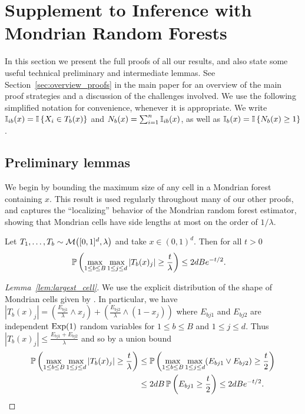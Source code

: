 
\chapter{Supplement to Inference with Mondrian Random Forests}
\label{app:mondrian}

In this section we present the full proofs of all our results,
and also state some useful technical preliminary and
intermediate lemmas.
See Section~\ref{sec:overview_proofs} in the main paper
for an overview of the main proof strategies and a discussion of
the challenges involved.
We use the following simplified notation for convenience,
whenever it is appropriate.
We write $\I_{i b}(x) = \I \left\{ X_i \in T_b(x) \right\}$
and $N_b(x) = \sum_{i=1}^{n} \I_{i b}(x)$,
as well as $\I_b(x) = \I \left\{ N_b(x) \geq 1 \right\}$.

\section{Preliminary lemmas}

We begin by bounding the maximum size of any cell
in a Mondrian forest containing $x$.
This result is used regularly throughout many of our other proofs,
and captures the ``localizing'' behavior of the Mondrian random
forest estimator, showing that Mondrian cells have side lengths
at most on the order of $1/\lambda$.

\begin{lemma}%
  \label{lem:largest_cell}
  Let $T_1, \ldots, T_b \sim \cM\big([0,1]^d, \lambda\big)$
  and take $x \in (0,1)^d$. Then for all $t > 0$
  \begin{align*}
    \P \left(
      \max_{1 \leq b \leq B}
      \max_{1 \leq j \leq d}
      |T_b(x)_j|
      \geq \frac{t}{\lambda}
    \right)
    &\leq
    2dB e^{-t/2}.
  \end{align*}

\end{lemma}

\begin{proof}[Lemma~\ref{lem:largest_cell}]
  We use the explicit distribution of the shape of Mondrian cells
  given by \citet[Proposition~1]{mourtada2020minimax}.
  In particular, we have
  $|T_b(x)_j| = \left( \frac{E_{bj1}}{\lambda} \wedge x_j \right)
  + \left( \frac{E_{bj2}}{\lambda} \wedge (1-x_j) \right)$
  where $E_{bj1}$ and $E_{bj2}$
  are independent $\Exp(1)$ random variables for
  $1 \leq b \leq B$ and $1 \leq j \leq d$.
  Thus $|T_b(x)_j| \leq \frac{E_{bj1} + E_{bj2}}{\lambda}$
  and so by a union bound
  \begin{align*}
    \P \left(
      \max_{1 \leq b \leq B}
      \max_{1 \leq j \leq d}
      |T_b(x)_j|
      \geq \frac{t}{\lambda}
    \right)
    &\leq
    \P \left(
      \max_{1 \leq b \leq B}
      \max_{1 \leq j \leq d}
      (E_{bj1} \vee E_{bj2})
      \geq \frac{t}{2}
    \right) \\
    &\leq
    2dB\,
    \P \left(
      E_{bj1}
      \geq \frac{t}{2}
    \right)
    \leq
    2dB e^{-t/2}.
  \end{align*}
\end{proof}

